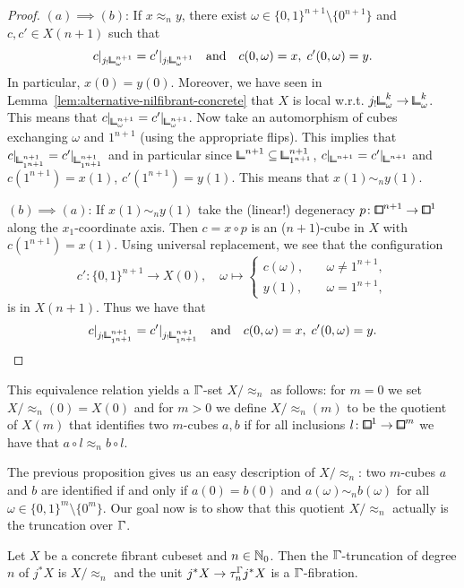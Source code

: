 \begin{proof}
$(a)\implies (b)$:
If $x\approx_n y$, there exist $\omega\in\{0,1\}^{n+1}\setminus\{0^{n+1}\}$ and $c,c'\in X(n+1)$ such that
\[
    c\rvert_{j_!{\bbcor}^{n+1}_\omega} = c'\rvert_{j_!{\bbcor}^{n+1}_\omega} \quad\text{and}\quad c(0,\omega) = x,\; c'(0,\omega) = y.
\]
In particular, $x(0) = y(0)$.
Moreover, we have seen in Lemma~\ref{lem:alternative-nilfibrant-concrete}
that $X$ is local w.r.t. $j_!{\bbcor}^k_\omega\to{\bbcor}^k_\omega$.
This means that $c\rvert_{{\bbcor}^{n+1}_\omega} = c'\rvert_{{\bbcor}^{n+1}_\omega}$.
Now take an automorphism of cubes exchanging $\omega$ and $1^{n+1}$ (using the appropriate flips).
This implies that $c\rvert_{{\bbcor}^{n+1}_{1^{n+1}}} = c'\rvert_{{\bbcor}^{n+1}_{1^{n+1}}}$ and in particular since ${\bbcor}^{n+1}\sub{\bbcor}^{n+1}_{1^{n+1}}$,
$c\rvert_{{\bbcor}^{n+1}} = c'\rvert_{{\bbcor}^{n+1}}$ and $c(1^{n+1}) = x(1)$, $c'(1^{n+1}) = y(1)$.
This means that $x(1)\sim_n y(1)$.

$(b)\implies (a)$:
If $x(1)\sim_n y(1)$ take the (linear!) degeneracy $p\colon{\bbox}^{n+1}\to{\bbox}^1$ along the $x_1$-coordinate axis.
Then $c = x\circ p$ is an ($n+1$)-cube in $X$ with $c(1^{n+1}) = x(1)$.
Using universal replacement, we see that the configuration
\[
    c'\colon\{0,1\}^{n+1}\to X(0),\quad\omega\mapsto\begin{cases}
        c(\omega),\quad &\omega\neq 1^{n+1}, \\
        y(1),\quad &\omega = 1^{n+1},
    \end{cases}
\]
is in $X(n+1)$.
Thus we have that
\[
    c\rvert_{j_!{\bbcor}^{n+1}_{1^{n+1}}} = c'\rvert_{j_!{\bbcor}^{n+1}_{1^{n+1}}} \quad\text{and}\quad c(0,\omega) = x,\; c'(0,\omega) = y.\qedhere
\]
\end{proof}

This equivalence relation yields a $\bbGamma$-set $X/\approx_n$ as follows:
for $m=0$ we set $X/\approx_n(0) = X(0)$ and for $m>0$ we define $X/\approx_n(m)$ to be the quotient of $X(m)$ that identifies two $m$-cubes $a,b$
if for all inclusions $l\colon{\bblox}^1\to{\bblox}^m$ we have that $a\circ l \approx_n b\circ l$.

The previous proposition gives us an easy description of $X/\approx_n$:
two $m$-cubes $a$ and $b$ are identified if and only if $a(0) = b(0)$ and $a(\omega) \sim_n b(\omega)$ for all $\omega\in\{0,1\}^m\setminus\{0^m\}$.
Our goal now is to show that this quotient $X/\approx_n$ actually is the truncation over $\bbGamma$.

\begin{proposition}\label{prop:trunc-concfib-gamma}
Let $X$ be a concrete fibrant cubeset and $n\in{\mathbb{N}}_0$.
Then the $\bbGamma$-truncation of degree $n$ of $j^\ast X$ is $X/\approx_n$ and the unit $j^\ast X\to\tau^{\bbGamma}_n j^\ast X$ is a $\bbGamma$-fibration.
\end{proposition}

